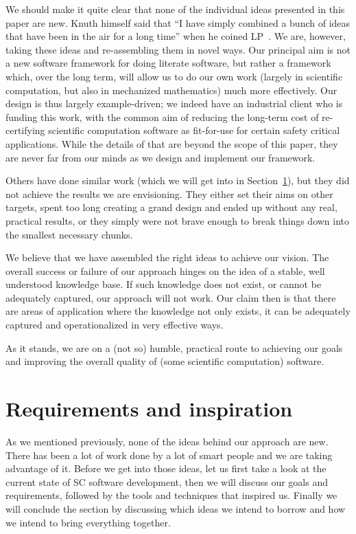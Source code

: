 \documentclass[preprint, 10pt]{sigplanconf}
\begin{document}
We should make it quite clear that none of the individual ideas presented
in this paper are new.  Knuth himself
said that ``I have simply combined a bunch of ideas that have been in the air
for a long time'' when he coined LP~\cite{Knuth1984}. We are, however, taking these
ideas and re-assembling them in novel ways.  Our principal aim is not a new
software framework for doing literate software, but rather a framework which,
over the long term, will allow us to do our own work (largely in scientific
computation, but also in mechanized mathematics) much more effectively.  Our design
is thus largely example-driven; we indeed have an industrial client who is funding
this work, with the common aim of reducing the long-term cost of re-certifying
scientific computation software as fit-for-use for certain safety critical 
applications.  While the details of that are beyond the scope of this paper, they 
are never far from our minds as we design and implement our framework.

Others have done similar work (which we will get into in Section~\ref{sec:bg}),
but they did not achieve the results we are envisioning. They either set their
aims on other targets, spent too long creating a grand design and ended up
without any real, practical results, or they simply were not brave enough to
break things down into the smallest necessary chunks.

We believe that we have assembled the right ideas to achieve our vision.
The overall success or failure of our approach hinges on the idea of a stable,
well understood knowledge base. If such knowledge does not exist, or cannot be
adequately captured, our approach will not work.  Our claim then is that there 
are areas of application where the knowledge not only exists, it can be adequately
captured and operationalized in very effective ways.

As it stands, we are on a (not so) humble, practical route to achieving our
goals and improving the overall quality of (some scientific computation) software.

\section{Requirements and inspiration}
\label{sec:bg}

As we mentioned previously, none of the ideas behind our approach are new. There
has been a lot of work done by a lot of smart people and we are taking advantage
of it. Before we get into those ideas, let us first take a look at the current
state of SC software development, then we will discuss our goals and
requirements, followed by the tools and techniques that inspired us. Finally we
will conclude the section by discussing which ideas we intend to borrow and
how we intend to bring everything together.
\end{document}
